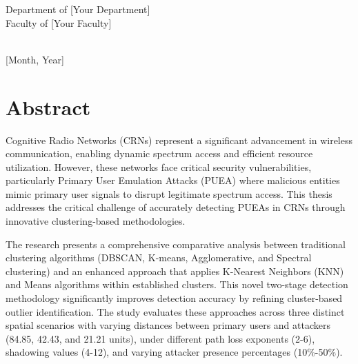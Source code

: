\documentclass[12pt,a4paper,twoside]{report}
\theoremstyle{mytheoremstyle}
\begin{document}
\begin{titlepage}
\begin{center}
        \Large
        Department of [Your Department]\\
        Faculty of [Your Faculty]\\
        [Your University]\\
        [University City, Country]
        
        \vspace{0.8cm}
        
        \Large
        [Month, Year]
        
        \vspace{0.5cm}
        
        
    \end{center}
\end{titlepage}

\chapter*{Abstract}

Cognitive Radio Networks (CRNs) represent a significant advancement in wireless communication, enabling dynamic spectrum access and efficient resource utilization. However, these networks face critical security vulnerabilities, particularly Primary User Emulation Attacks (PUEA) where malicious entities mimic primary user signals to disrupt legitimate spectrum access. This thesis addresses the critical challenge of accurately detecting PUEAs in CRNs through innovative clustering-based methodologies.

The research presents a comprehensive comparative analysis between traditional clustering algorithms (DBSCAN, K-means, Agglomerative, and Spectral clustering) and an enhanced approach that applies K-Nearest Neighbors (KNN) and Means algorithms within established clusters. This novel two-stage detection methodology significantly improves detection accuracy by refining cluster-based outlier identification. The study evaluates these approaches across three distinct spatial scenarios with varying distances between primary users and attackers (84.85, 42.43, and 21.21 units), under different path loss exponents (2-6), shadowing values (4-12), and varying attacker presence percentages (10\%-50\%).
\end{document}
